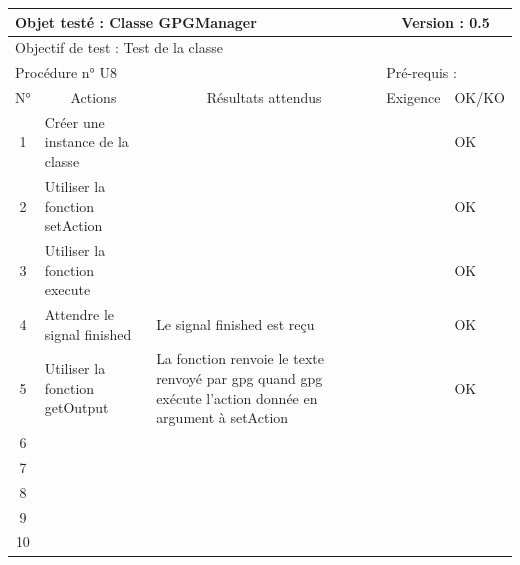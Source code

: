 \documentclass{../res/univ-projet}
\begin{document}
\begin{center}
    \begin{tabular}{|c|p{5cm}|p{5cm}|p{1.5cm}|p{1.5cm}|}
      \hline
      \multicolumn{3}{|l|}{Objet testé : Classe GPGManager} & \multicolumn{2}{c|}{Version : 0.5}\\ \hline
      \multicolumn{5}{|l|}{Objectif de test : Test de la classe}\\ \hline
      \multicolumn{3}{|l|}{Procédure n° U8} & \multicolumn{2}{p{3cm}|}{Pré-requis : }\\ \hline
      \multicolumn{1}{|c|}{N°} & \multicolumn{1}{c|}{Actions} & \multicolumn{1}{c|}{Résultats attendus} & 
      \multicolumn{1}{c|}{Exigence} & \multicolumn{1}{c|}{OK/KO}\\ \hline
      1 & Créer une instance de la classe &  &  & OK \\
      2 & Utiliser la fonction setAction &  &  & OK \\
      3 & Utiliser la fonction execute &  &  & OK \\
      4 & Attendre le signal finished & Le signal finished est reçu &  & OK \\
      5 & Utiliser la fonction getOutput & La fonction renvoie le texte renvoyé par gpg quand gpg exécute l'action donnée en argument à setAction &  & OK \\
	    6 & &  &  &  \\
      7 &  &  &  &  \\
      8 &  &  &  &  \\
      9 &  &  &  & \\
      10 &  &  &  & \\ 
	\hline
    \end{tabular}
    \vskip 2.2cm
	


\end{center}
\end{document}
